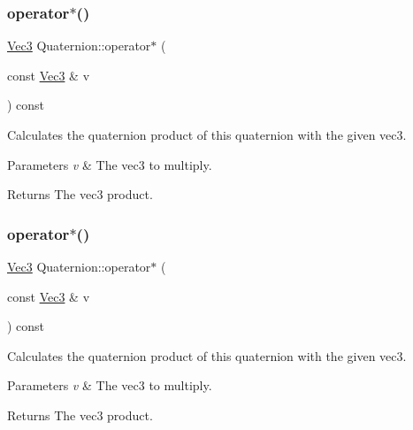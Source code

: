 \subsubsection{\texorpdfstring{operator$\ast$()}{operator*()}\hspace{0.1cm}{\footnotesize\ttfamily [3/4]}}
{\footnotesize\ttfamily \hyperlink{classVec3}{Vec3} Quaternion\+::operator$\ast$ (\begin{DoxyParamCaption}\item[{const \hyperlink{classVec3}{Vec3} \&}]{v }\end{DoxyParamCaption}) const\hspace{0.3cm}{\ttfamily [inline]}}

Calculates the quaternion product of this quaternion with the given vec3. 
\begin{DoxyParams}{Parameters}
{\em v} & The vec3 to multiply. \\
\hline
\end{DoxyParams}
\begin{DoxyReturn}{Returns}
The vec3 product. 
\end{DoxyReturn}
\mbox{\label{classQuaternion_a8b63a645c77ec58d1caa6ccb80f51c3b}} 
\subsubsection{\texorpdfstring{operator$\ast$()}{operator*()}\hspace{0.1cm}{\footnotesize\ttfamily [4/4]}}
{\footnotesize\ttfamily \hyperlink{classVec3}{Vec3} Quaternion\+::operator$\ast$ (\begin{DoxyParamCaption}\item[{const \hyperlink{classVec3}{Vec3} \&}]{v }\end{DoxyParamCaption}) const\hspace{0.3cm}{\ttfamily [inline]}}

Calculates the quaternion product of this quaternion with the given vec3. 
\begin{DoxyParams}{Parameters}
{\em v} & The vec3 to multiply. \\
\hline
\end{DoxyParams}
\begin{DoxyReturn}{Returns}
The vec3 product. 
\end{DoxyReturn}
\mbox{\label{classQuaternion_a8941e3b43aabd15e2471e57ebd49c8a7}} 

